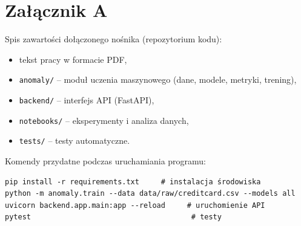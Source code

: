 \chapter*{Załącznik A}

Spis zawartości dołączonego nośnika (repozytorium kodu):
\begin{itemize}
  \item tekst pracy w formacie PDF,
  \item \texttt{anomaly/} -- moduł uczenia maszynowego (dane, modele, metryki, trening),
  \item \texttt{backend/} -- interfejs API (FastAPI),
  \item \texttt{notebooks/} -- eksperymenty i analiza danych,
  \item \texttt{tests/} -- testy automatyczne.
\end{itemize}

Komendy przydatne podczas uruchamiania programu:
\begin{lstlisting}
pip install -r requirements.txt     # instalacja środowiska
python -m anomaly.train --data data/raw/creditcard.csv --models all
uvicorn backend.app.main:app --reload     # uruchomienie API
pytest                                     # testy
\end{lstlisting}
